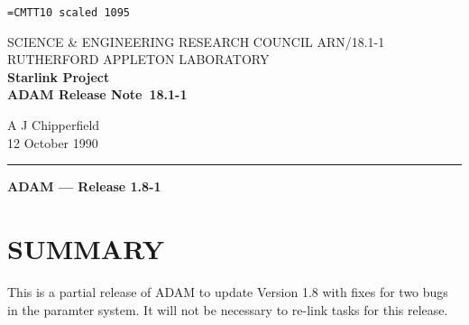 \pagestyle{myheadings}

\newcommand{\stardoccategory}  {ADAM Release Note}
\newcommand{\stardocinitials}  {ARN}
\newcommand{\stardocnumber}    {18.1-1}
\newcommand{\stardocauthors}   {A J Chipperfield}
\newcommand{\stardocdate}      {12 October 1990}
\newcommand{\stardoctitle}     {ADAM --- Release 1.8-1}

\newcommand{\stardocname}{\stardocinitials /\stardocnumber}
\markright{\stardocname}
\setlength{\textwidth}{160mm}
\setlength{\textheight}{240mm}
\setlength{\topmargin}{-5mm}
\setlength{\oddsidemargin}{0mm}
\setlength{\evensidemargin}{0mm}
\setlength{\parindent}{0mm}
\setlength{\parskip}{\medskipamount}
\setlength{\unitlength}{1mm}


\font\tt=CMTT10 scaled 1095
\renewcommand{\_}{{\tt\char'137}}


\thispagestyle{empty}
SCIENCE \& ENGINEERING RESEARCH COUNCIL \hfill \stardocname\\
RUTHERFORD APPLETON LABORATORY\\
{\large\bf Starlink Project\\}
{\large\bf \stardoccategory\ \stardocnumber}
\begin{flushright}
\stardocauthors\\
\stardocdate
\end{flushright}
\vspace{-4mm}
\rule{\textwidth}{0.5mm}
\vspace{5mm}
\begin{center}
{\Large\bf \stardoctitle}
\end{center}
\vspace{5mm}

\section{SUMMARY}
This is a partial release of ADAM to update Version 1.8 with fixes for two
bugs in the paramter system.
It will not be necessary to re-link tasks for this release.

